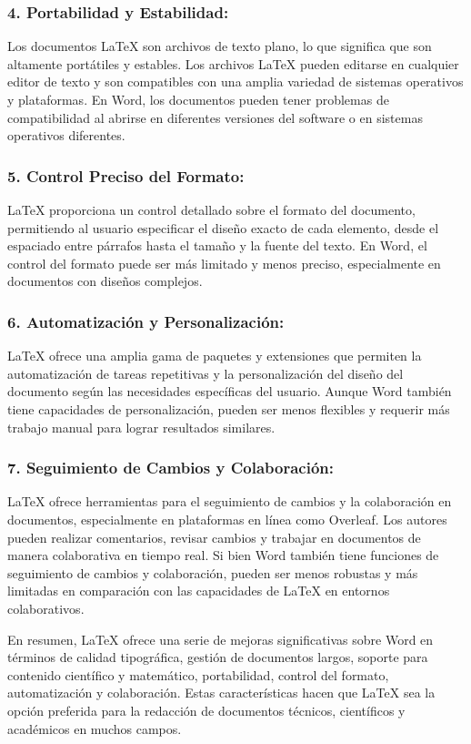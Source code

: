 \documentclass{article}
\begin{document}
\subsubsection{4. Portabilidad y Estabilidad:}
Los documentos LaTeX son archivos de texto plano, lo que significa que son altamente portátiles y estables. Los archivos LaTeX pueden editarse en cualquier editor de texto y son compatibles con una amplia variedad de sistemas operativos y plataformas.
En Word, los documentos pueden tener problemas de compatibilidad al abrirse en diferentes versiones del software o en sistemas operativos diferentes.


\subsubsection{5. Control Preciso del Formato:}
LaTeX proporciona un control detallado sobre el formato del documento, permitiendo al usuario especificar el diseño exacto de cada elemento, desde el espaciado entre párrafos hasta el tamaño y la fuente del texto.
En Word, el control del formato puede ser más limitado y menos preciso, especialmente en documentos con diseños complejos.


\subsubsection{6. Automatización y Personalización:}
LaTeX ofrece una amplia gama de paquetes y extensiones que permiten la automatización de tareas repetitivas y la personalización del diseño del documento según las necesidades específicas del usuario.
Aunque Word también tiene capacidades de personalización, pueden ser menos flexibles y requerir más trabajo manual para lograr resultados similares.


\subsubsection{7. Seguimiento de Cambios y Colaboración:}
LaTeX ofrece herramientas para el seguimiento de cambios y la colaboración en documentos, especialmente en plataformas en línea como Overleaf. Los autores pueden realizar comentarios, revisar cambios y trabajar en documentos de manera colaborativa en tiempo real.
Si bien Word también tiene funciones de seguimiento de cambios y colaboración, pueden ser menos robustas y más limitadas en comparación con las capacidades de LaTeX en entornos colaborativos.


En resumen, LaTeX ofrece una serie de mejoras significativas sobre Word en términos de calidad tipográfica, gestión de documentos largos, soporte para contenido científico y matemático, portabilidad, control del formato, automatización y colaboración. Estas características hacen que LaTeX sea la opción preferida para la redacción de documentos técnicos, científicos y académicos en muchos campos.
\end{document}
